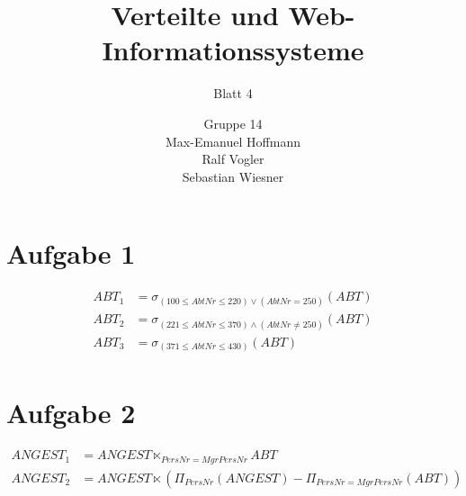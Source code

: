 \documentclass[11pt,a4paper]{scrartcl}
\begin{document}
\author{Gruppe 14\\Max-Emanuel Hoffmann\\Ralf Vogler\\Sebastian Wiesner}
\title{Verteilte und Web-Informationssysteme}
\subtitle{Blatt 4}

\maketitle

\section*{Aufgabe 1}

\begin{align*}
  ABT_1 &= \sigma_{(100 \leq AbtNr \leq 220) \vee (AbtNr = 250)}(ABT) \\
  ABT_2 &= \sigma_{(221 \leq AbtNr \leq 370) \wedge (AbtNr \neq 250)}(ABT) \\
  ABT_3 &= \sigma_{(371 \leq AbtNr \leq 430)}(ABT) \\
\end{align*}

\section*{Aufgabe 2}

\begin{align*}
  ANGEST_1 &= ANGEST \ltimes_{PersNr=MgrPersNr} ABT \\
  ANGEST_2 &= ANGEST \ltimes (\Pi_{PersNr}(ANGEST) - \Pi_{PersNr=MgrPersNr}(
  ABT)) \\
\end{align*}
\end{document}
